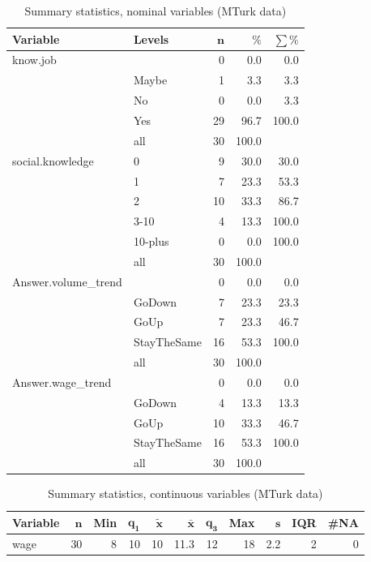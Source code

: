 \documentclass[a4paper,10pt]{article}\usepackage[]{graphicx}\usepackage[]{color}
\begin{document}
\begin{table}[ht]
\centering
{\footnotesize
\begin{tabular}{ll|rrr}
 \textbf{Variable} & \textbf{Levels} & $\mathbf{n}$ & $\mathbf{\%}$ & $\mathbf{\sum \%}$ \\ 
  \hline
know.job &  & 0 & 0.0 & 0.0 \\ 
   & Maybe & 1 & 3.3 & 3.3 \\ 
   & No & 0 & 0.0 & 3.3 \\ 
   & Yes & 29 & 96.7 & 100.0 \\ 
   \hline
 & all & 30 & 100.0 &  \\ 
   \hline
\hline
social.knowledge & 0 & 9 & 30.0 & 30.0 \\ 
   & 1 & 7 & 23.3 & 53.3 \\ 
   & 2 & 10 & 33.3 & 86.7 \\ 
   & 3-10 & 4 & 13.3 & 100.0 \\ 
   & 10-plus & 0 & 0.0 & 100.0 \\ 
   \hline
 & all & 30 & 100.0 &  \\ 
   \hline
\hline
Answer.volume\_trend &  & 0 & 0.0 & 0.0 \\ 
   & GoDown & 7 & 23.3 & 23.3 \\ 
   & GoUp & 7 & 23.3 & 46.7 \\ 
   & StayTheSame & 16 & 53.3 & 100.0 \\ 
   \hline
 & all & 30 & 100.0 &  \\ 
   \hline
\hline
Answer.wage\_trend &  & 0 & 0.0 & 0.0 \\ 
   & GoDown & 4 & 13.3 & 13.3 \\ 
   & GoUp & 10 & 33.3 & 46.7 \\ 
   & StayTheSame & 16 & 53.3 & 100.0 \\ 
   \hline
 & all & 30 & 100.0 &  \\ 
   \hline
\hline
\end{tabular}
}
\caption{Summary statistics, nominal variables (MTurk data)} 
\label{tab1:43-4170}
\end{table}
\begin{table}[ht]
\centering
{\footnotesize
\begin{tabular}{lrrrrrrrrrr}
 \textbf{Variable} & $\mathbf{n}$ & \textbf{Min} & $\mathbf{q_1}$ & $\mathbf{\widetilde{x}}$ & $\mathbf{\bar{x}}$ & $\mathbf{q_3}$ & \textbf{Max} & $\mathbf{s}$ & \textbf{IQR} & \textbf{\#NA} \\ 
  \hline
wage & 30 & 8 & 10 & 10 & 11.3 & 12 & 18 & 2.2 & 2 & 0 \\ 
  \end{tabular}
}
\caption{Summary statistics, continuous variables (MTurk data)} 
\label{tab2:43-4170}
\end{table}
\end{document}
